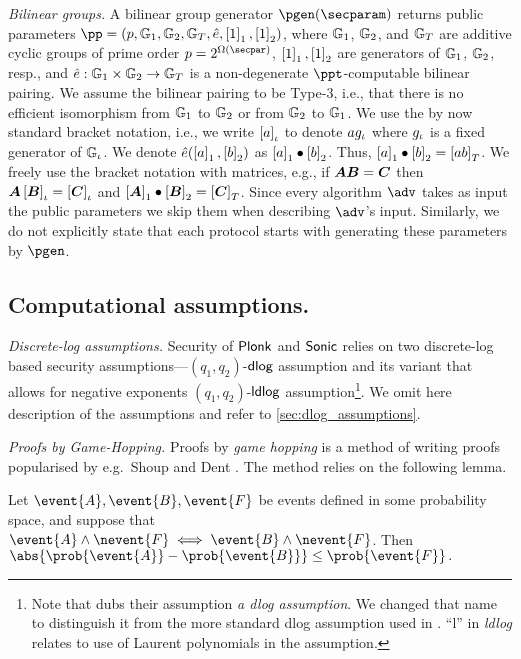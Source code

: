 \documentclass[runningheads,11pt]{llncs}
\let\spvec\vec
\let\vec\accentvec
\let\spvec\vec
\let\vec\spvec
\def\vec#1{\mathchoice{\mbox{\boldmath$\displaystyle#1$}}
  {\mbox{\boldmath$\textstyle#1$}} {\mbox{\boldmath$\scriptstyle#1$}}
  {\mbox{\boldmath$\scriptscriptstyle#1$}}}
\newcommand{\ourpar}[1] {\smallskip\noindent\emph{#1}}
\begin{document}
\ourpar{Bilinear groups.}
A bilinear group generator $\pgen (\secparam)$ returns public parameters $ \pp =
(p, \GRP_1, \GRP_2, \GRP_T, \pair, \gone{1}, \gtwo{1})$, where $\mathbb{G}_1$,
$\mathbb{G}_2$, and $\mathbb{G}_T$ are additive cyclic groups of prime order $p = 2^{\Omega
  (\secpar)}$, $\left[1\right]_{1}, \left[1\right]_{2}$ are generators of $\mathbb{G}_1$, $\mathbb{G}_2$, resp.,
and $\hat{e}: \mathbb{G}_1 \times \mathbb{G}_2 \to \mathbb{G}_T$ is a non-degenerate
$\ppt$-computable bilinear pairing. We assume the bilinear pairing to be Type-3,
i.e., that there is no efficient isomorphism from $\mathbb{G}_1$ to $\mathbb{G}_2$ or from
$\mathbb{G}_2$ to $\mathbb{G}_1$. We use the by now standard bracket notation, i.e., we
write $\left[a\right]_{\iota}$ to denote $a g_{\iota}$ where $g_{\iota}$ is a fixed generator
of $\mathbb{G}_{\iota}$. We denote $\hat{e} (\left[a\right]_{1}, \left[b\right]_{2})$ as $\left[a\right]_{1} \bullet
\left[b\right]_{2}$. Thus, $\left[a\right]_{1} \bullet \left[b\right]_{2} = \left[a b\right]_{T}$. We freely use the
bracket notation with matrices, e.g., if $\vec{A} \vec{B} = \vec{C}$ then
$\vec{A} \grpgi{\vec{B}} = \grpgi{\vec{C}}$ and $\gone{\vec{A}}\bullet
\gtwo{\vec{B}} = \gtar{\vec{C}}$. Since every algorithm $\adv$ takes as input
the public parameters we skip them when describing $\adv$'s input. Similarly, we
do not explicitly state that each protocol starts with generating these
parameters by $\pgen$.

\subsection{Computational assumptions.}

\ourpar{Discrete-log assumptions.}  Security of $\textnormal{\textsf{Plonk}}$ and ${\textnormal{\textsf{Sonic}}}$ relies on
two discrete-log based security assumptions---$(q_1, q_2)$-$\mathsf{dlog}$ assumption
and its variant that allows for negative exponents $(q_1, q_2)$-$\mathsf{ldlog}$
assumption\footnote{Note that \cite{CCS:MBKM19} dubs their assumption \emph{a
    dlog assumption}. We changed that name to distinguish it from the more
  standard dlog assumption used in \cite{EPRINT:GabWilCio19}. ``l'' in
  \emph{ldlog} relates to use of Laurent polynomials in the assumption.}. We
omit here description of the assumptions and refer to
\cref{sec:dlog_assumptions}.



\ourpar{Proofs by Game-Hopping.}
Proofs by \emph{game hopping} is a method of writing proofs popularised by
e.g.~Shoup \cite{EPRINT:Shoup04} and Dent \cite{EPRINT:Dent06c}. The method
relies on the following lemma.

\begin{lemma}
	\label{lem:difference_lemma}
	Let $\event{A}, \event{B}, \event{F}$ be events defined in some probability
	space, and suppose that $\event{A} \land \nevent{F} \iff \event{B}
		\land \nevent{F}$.  Then 
	$
		\abs{\prob{\event{A}} - \prob{\event{B}}} \leq \prob{\event{F}}\,.
	$
\end{lemma}
\end{document}
